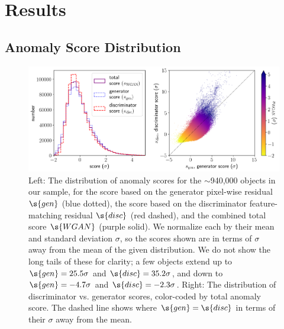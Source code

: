 


\section{Results}
\label{sec:results}

\subsection{Anomaly Score Distribution}
\label{sec:sanom_dist}

\begin{figure}
    \centering
    \includegraphics[width=\textwidth]{score_distribution}
    \caption{Left: The distribution of anomaly scores for the $\sim$940,000 objects in our sample, for the score based on the generator pixel-wise residual $\s{gen}$ (blue dotted), the score based on the discriminator feature-matching residual $\s{disc}$ (red dashed), and the combined total score $\s{WGAN}$ (purple solid). We normalize each by their mean and standard deviation $\sigma$, so the scores shown are in terms of $\sigma$ away from the mean of the given distribution. We do not show the long tails of these for clarity; a few objects extend up to $\s{gen}=25.5\sigma$ and $\s{disc}=35.2\sigma$, and down to $\s{gen}=-4.7\sigma$ and $\s{disc}=-2.3\sigma$.
    Right: The distribution of discriminator vs. generator scores, color-coded by total anomaly score. The dashed line shows where $\s{gen}=\s{disc}$ in terms of their $\sigma$ away from the mean.}
    \label{fig:dist}
\end{figure}

